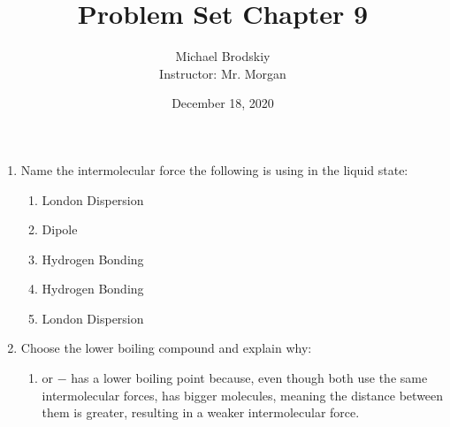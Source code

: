 \documentclass[12pt]{article}
\title{Problem Set Chapter 9}
\date{December 18, 2020}
\author{Michael Brodskiy\\ \small Instructor: Mr. Morgan}
\begin{document}
\maketitle

\begin{enumerate}

  \item Name the intermolecular force the following is using in the liquid state:

    \begin{enumerate}

      \item {}

        \begin{center}
          London Dispersion
        \end{center}

      \item {}

        \begin{center}
          Dipole
        \end{center}

      \item {}

        \begin{center}
          Hydrogen Bonding
        \end{center}

      \item {}

        \begin{center}
          Hydrogen Bonding
        \end{center}

      \item {}

        \begin{center}
          London Dispersion
        \end{center}

    \end{enumerate}

  \item Choose the lower boiling compound and explain why:

    \begin{enumerate}

      \item \underline{} or  $-$  has a lower boiling point because, even though both use the same intermolecular forces,  has bigger molecules, meaning the distance between them is greater, resulting in a weaker intermolecular force.


\end{enumerate}
\end{enumerate}
\end{document}
